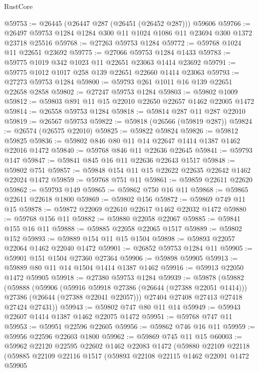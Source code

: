 \begin{lexlean}{RustCore}
\begin{coremodule}
@59753 := @26445 (@26447 @287 (@26451 (@26452 @287))) @59606
@59766 := @26497 @59753 @1284 @1284 @300 @11 @1024 @1086 @11 @23694 @300 @1372 @23718 @25516
@59768 := @27263 @59753 @1284
@59772 := @59768 @1024 @11 @22651 @23692
@59775 := @27066 @59753 @1284 @1433
@59783 := @59775 @1019 @342 @1023 @11 @22651 @23063 @1414 @23692
@59791 := @59775 @1012 @1017 @258 @139 @22651 @22660 @1414 @23063
@59793 := @27273 @59753 @1284
@59800 := @59793 @261 @1011 @16 @139 @22651 @22658 @2858
@59802 := @27247 @59753 @1284
@59803 := @59802 @1009
@59812 := @59803 @891 @11 @15 @22010 @22650 @22657 @1462 @22005 @1472
@59814 := @26558 @59753 @1284
@59818 := @59814 @287 @11 @287 @22010
@59819 := @26567 @59753
@59822 := @59818 (@26566 (@59819 @287))
@59824 := @26574 (@26575 @22010)
@59825 := @59822 @59824
@59826 := @59812 @59825
@59836 := @59802 @846 @80 @11 @14 @22647 @1414 @1387 @1462 @22016 @1472
@59840 := @59768 @846 @11 @22636 @22645
@59841 := @59793 @147
@59847 := @59841 @845 @16 @11 @22636 @22643 @1517
@59848 := @59802 @751
@59857 := @59848 @154 @11 @15 @22622 @22635 @22642 @1462 @22024 @1472
@59859 := @59768 @751 @11
@59861 := @59859 @22611 @22620
@59862 := @59793 @149
@59865 := @59862 @750 @16 @11
@59868 := @59865 @22611 @22618 @1800
@59869 := @59802 @156
@59872 := @59869 @749 @11 @15
@59878 := @59872 @22069 @22610 @22617 @1462 @22032 @1472
@59880 := @59768 @156 @11
@59882 := @59880 @22058 @22067
@59885 := @59841 @155 @16 @11
@59888 := @59885 @22058 @22065 @1517
@59889 := @59802 @152
@59893 := @59889 @154 @11 @15 @1504
@59898 := @59893 @22057 @22064 @1462 @22040 @1472
@59901 := @26852 @59753 @1284 @11
@59905 := @59901 @151 @1504 @27360 @27364
@59906 := @59898 @59905
@59913 := @59889 @80 @11 @14 @1504 @1414 @1387 @1462
@59916 := @59913 @22050 @1472 @59905
@59918 := @27380 @59753 @1284
@59939 := @59878
    (@59882
      (@59888
        (@59906
          (@59916 @59918 @27386 (@26644 (@27388 @22051 @1414)))
          @27386
          (@26644 (@27388 @22041 @22057)))
        @27404
        @27408
        @27413
        @27418
        @27424
        @27431))
@59943 := @59802 @747 @80 @11 @14
@59949 := @59943 @22607 @1414 @1387 @1462 @22075 @1472
@59951 := @59768 @747 @11
@59953 := @59951 @22596 @22605
@59956 := @59862 @746 @16 @11
@59959 := @59956 @22596 @22603 @1800
@59962 := @59869 @745 @11 @15
@60003 := @59962
    @22120
    @22595
    @22602
    @1462
    @22083
    @1472
    (@59880
      @22109
      @22118
      (@59885
        @22109
        @22116
        @1517
        (@59893
          @22108
          @22115
          @1462
          @22091
          @1472
          @59905

\end{coremodule}
\end{lexlean}
